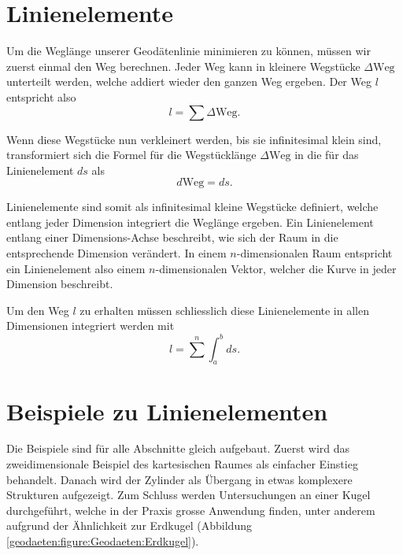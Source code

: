 %
%
%
%
\section{Linienelemente\label{geodaeten:section:Linienelemente}}

Um die Weglänge unserer Geodätenlinie minimieren zu können, müssen wir zuerst einmal den Weg berechnen.
Jeder Weg kann in kleinere Wegstücke $\Delta \text{Weg}$ unterteilt werden, welche addiert wieder den ganzen Weg ergeben.
Der Weg $l$ entspricht also
\begin{equation}
	l = \sum \Delta \text{Weg} .
\end{equation}

Wenn diese Wegstücke nun verkleinert werden, bis sie infinitesimal klein sind, transformiert sich die Formel für die Wegstücklänge $\Delta \text{Weg}$ in die für das Linienelement $ds$ als
\begin{equation}	
	d\text{Weg} = ds .
	\label{geodaeten:equation:Linienelemente:equation1}
\end{equation}

Linienelemente sind somit als infinitesimal kleine Wegstücke definiert, welche entlang jeder Dimension integriert die Weglänge ergeben.
Ein Linienelement entlang einer Dimensions-Achse beschreibt, wie sich der Raum in die entsprechende Dimension verändert.
In einem $n$-dimensionalen Raum entspricht ein Linienelement also einem $n$-dimensionalen Vektor, welcher die Kurve in jeder Dimension beschreibt.

Um den Weg $l$ zu erhalten müssen schliesslich diese Linienelemente in allen Dimensionen integriert werden mit
\begin{equation}
	l = 
	\sum^{n} \int_a^b ds .
	\label{geodaeten:equation:Linienelemente:equation2}
\end{equation}

\section{Beispiele zu Linienelementen\label{geodaeten:section:Linienelemente:Beispiele}}
Die Beispiele sind für alle Abschnitte gleich aufgebaut.
Zuerst wird das zweidimensionale Beispiel des kartesischen Raumes als einfacher Einstieg behandelt.
Danach wird der Zylinder als Übergang in etwas komplexere Strukturen aufgezeigt.
Zum Schluss werden Untersuchungen an einer Kugel durchgeführt, welche in der Praxis grosse Anwendung finden, unter anderem aufgrund der Ähnlichkeit zur Erdkugel (Abbildung \ref{geodaeten:figure:Geodaeten:Erdkugel}).

	
	
	

